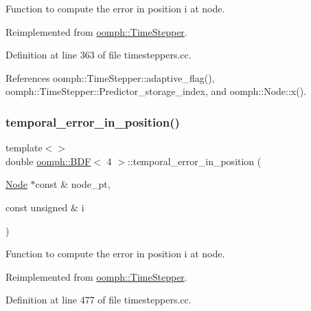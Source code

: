Function to compute the error in position i at node. 



Reimplemented from \hyperlink{classoomph_1_1TimeStepper_ac463807aff4bcbedd6e8a463c7390536}{oomph\+::\+Time\+Stepper}.



Definition at line 363 of file timesteppers.\+cc.



References oomph\+::\+Time\+Stepper\+::adaptive\+\_\+flag(), oomph\+::\+Time\+Stepper\+::\+Predictor\+\_\+storage\+\_\+index, and oomph\+::\+Node\+::x().

\mbox{\label{classoomph_1_1BDF_a858e48dd8330b67d2693a2c785adc75b}} 
\subsubsection{\texorpdfstring{temporal\+\_\+error\+\_\+in\+\_\+position()}{temporal\_error\_in\_position()}\hspace{0.1cm}{\footnotesize\ttfamily [3/4]}}
{\footnotesize\ttfamily template$<$$>$ \\
double \hyperlink{classoomph_1_1BDF}{oomph\+::\+B\+DF}$<$ 4 $>$\+::temporal\+\_\+error\+\_\+in\+\_\+position (\begin{DoxyParamCaption}\item[{\hyperlink{classoomph_1_1Node}{Node} $\ast$const \&}]{node\+\_\+pt,  }\item[{const unsigned \&}]{i }\end{DoxyParamCaption})\hspace{0.3cm}{\ttfamily [virtual]}}



Function to compute the error in position i at node. 



Reimplemented from \hyperlink{classoomph_1_1TimeStepper_ac463807aff4bcbedd6e8a463c7390536}{oomph\+::\+Time\+Stepper}.



Definition at line 477 of file timesteppers.\+cc.

\mbox{\label{classoomph_1_1BDF_ae4ef2e161fb944b7e6fcf6f7ee47579b}} 
